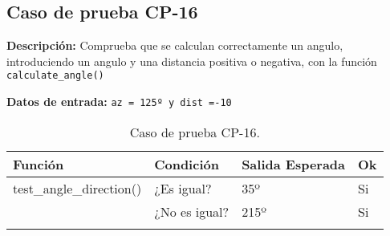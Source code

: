 \subsection{Caso de prueba CP-16}

\textbf{Descripción:} Comprueba que se calculan correctamente un angulo, introduciendo un angulo y una distancia positiva o negativa, con la función \texttt{calculate\_angle()}

\textbf{Datos de entrada:} \texttt{az = 125º y dist =-10}


\begin{longtable}[]{@{}llll@{}}
\toprule
\begin{minipage}[b]{0.6\columnwidth}\raggedright\strut
Función\strut
\end{minipage} & \begin{minipage}[b]{0.20\columnwidth}\raggedright\strut
Condición\strut
\end{minipage} & \begin{minipage}[b]{0.15\columnwidth}\raggedright\strut
Salida Esperada\strut
\end{minipage} & \begin{minipage}[b]{0.05\columnwidth}\raggedright\strut
Ok\strut
\end{minipage}\tabularnewline
\midrule
\endhead
\begin{minipage}[t]{0.6\columnwidth}\raggedright\strut
test\_angle\_direction()\strut
\end{minipage} & \begin{minipage}[t]{0.20\columnwidth}\raggedright\strut
¿Es igual?\strut
\end{minipage} & \begin{minipage}[t]{0.15\columnwidth}\raggedright\strut
35º\strut
\end{minipage} & \begin{minipage}[t]{0.05\columnwidth}\raggedright\strut
Si\strut
\end{minipage}\tabularnewline
\begin{minipage}[t]{0.6\columnwidth}\raggedright\strut
\strut
\end{minipage} & \begin{minipage}[t]{0.20\columnwidth}\raggedright\strut
¿No es igual?\strut
\end{minipage} & \begin{minipage}[t]{0.15\columnwidth}\raggedright\strut
215º\strut
\end{minipage} & \begin{minipage}[t]{0.05\columnwidth}\raggedright\strut
Si\strut
\end{minipage}\tabularnewline

\bottomrule
\caption{Caso de prueba CP-16.}
\end{longtable}

